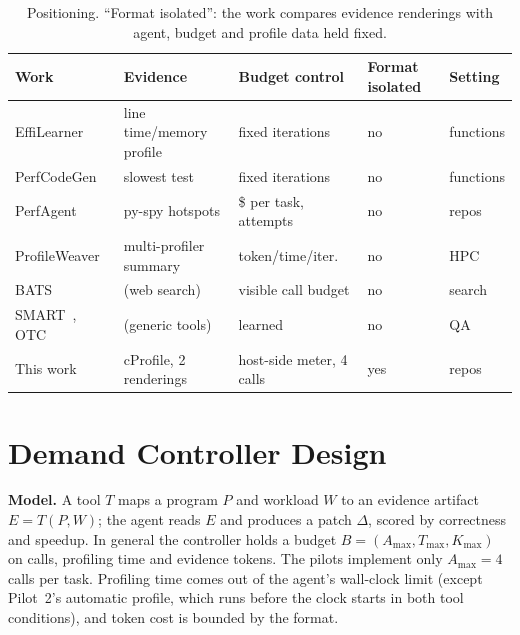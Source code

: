 \documentclass[conference]{IEEEtran}
\begin{document}
\begin{table}[t]
\caption{Positioning. ``Format isolated'': the work compares evidence
renderings with agent, budget and profile data held fixed.}
\label{tab:position}
\centering
\scriptsize
\setlength{\tabcolsep}{2pt}
\begin{tabular}{@{}>{\raggedright\arraybackslash}p{2.05cm}>{\raggedright\arraybackslash}p{1.95cm}>{\raggedright\arraybackslash}p{1.95cm}>{\centering\arraybackslash}p{0.75cm}>{\raggedright\arraybackslash}p{0.95cm}@{}}
\toprule
Work & Evidence & Budget control & Format isolated & Setting \\
\midrule
EffiLearner~\cite{huang2024effilearner} & line time/memory profile & fixed iterations & no & functions \\
PerfCodeGen~\cite{peng2025perfcodegen} & slowest test & fixed iterations & no & functions \\
PerfAgent~\cite{deng2026perfagent} & py-spy hotspots & \$ per task, attempts & no & repos \\
ProfileWeaver~\cite{ding2026profileweaver} & multi-profiler summary & token/time/iter.\ & no & HPC \\
BATS~\cite{liu2025bats} & (web search) & visible call budget & no & search \\
SMART~\cite{qian2025smart}, OTC~\cite{wang2025otc} & (generic tools) & learned & no & QA \\
This work & cProfile, 2 renderings & host-side meter, 4 calls & yes & repos \\
\bottomrule
\end{tabular}
\end{table}

\section{Demand Controller Design}
\label{sec:design}

\textbf{Model.} A tool $T$ maps a program $P$ and workload $W$ to an evidence
artifact $E=T(P,W)$; the agent reads $E$ and produces a patch $\Delta$, scored
by correctness and speedup. In general the controller holds a budget
$B=(A_{\max},T_{\max},K_{\max})$ on calls, profiling time and evidence tokens.
The pilots implement only $A_{\max}=4$ calls per task. Profiling time comes out
of the agent's wall-clock limit (except Pilot~2's automatic profile, which runs
before the clock starts in both tool conditions), and token cost is bounded by
the format.
\end{document}

